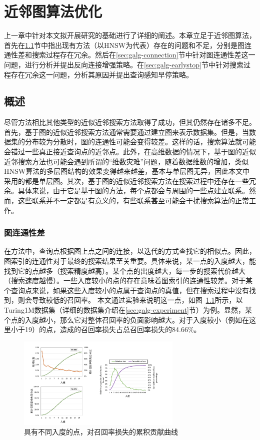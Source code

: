 
\chapter{近邻图算法优化}
上一章中针对本文拟开展研究的基础进行了详细的阐述。本章立足于近邻图算法，首先在\ref{sec:galg-overview}节中指出现有\ganns 方法（以HNSW为代表）存在的问题和不足，分别是图连通性差和搜索过程存在冗余。然后在\ref{sec:galg-connection}节中针对图连通性差这一问题，进行分析并提出反向连接增强策略。在\ref{sec:galg-earlystop}节中针对搜索过程存在冗余这一问题，分析其原因并提出查询感知早停策略。


\section{概述}\label{sec:galg-overview}
尽管\ganns 方法相比其他类型的近似近邻搜索方法取得了成功，但其仍然存在诸多不足。首先，基于图的近似近邻搜索方法通常需要通过建立图来表示数据集。但是，当数据集的分布较为分散时，图的连通性可能会变得较差。这样的话，搜索算法就可能会错过一些真正接近查询点的近邻点。此外，在高维数据的情况下，基于图的近似近邻搜索方法也可能会遇到所谓的“维数灾难”问题，随着数据维数的增加，类似HNSW算法的多层图结构的效果变得越来越差，基本与单层图无异，因此本文中采用的都是单层图。其次，基于图的近似近邻搜索方法在搜索过程中还存在一些冗余。具体来说，由于它是基于图的方法，每个点都会与周围的一些点建立联系。然而，这些联系并不一定都是有意义的，有些联系甚至可能会干扰搜索算法的正常工作。

\subsection{图连通性差}
在\ganns 方法中，查询点根据图上点之间的连接，以迭代的方式查找它的相似点。因此，图索引的连通性对于最终的搜索结果至关重要。具体来说，某一点的入度越大，能找到它的点越多（搜索精度越高）。某个点的出度越大，每一步的搜索代价越大（搜索速度越慢）。一些入度较小的点的存在意味着图索引的连通性较差。对于某个查询点来说，如果这些入度较小的点属于查询点的真值，但在搜索过程中没有找到，则会导致较低的召回率。
本文通过实验来说明这一点，如图~\ref{fig:percent-in-degree}所示，以Turing1M数据集（详细的数据集介绍在\ref{sec:galg-experiment}节）为例。显然，某个点的入度越小，那么它对整体召回率的负面影响越大。对于入度较小（例如在这里小于19）的点，造成的召回率损失占总召回率损失的84.66\%。
\begin{figure}[htbp]
  \centering
  \includegraphics[width=0.7\textwidth]{figures/context-1/percent-in-degree.pdf}
  \caption{具有不同入度的点，对召回率损失的累积贡献曲线}
  \label{fig:percent-in-degree}
\end{figure}

